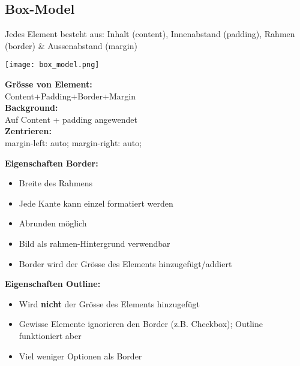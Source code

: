 \documentclass[7pt,landscape,a4paper]{scrartcl}
\begin{document}
\begin{multicols*}{4}
\subsection{Box-Model}
	Jedes Element besteht aus: \textcolor{b}{Inhalt} (content), \textcolor{b}{Innenabstand} (padding), \textcolor{b}{Rahmen} (border) \& \textcolor{b}{Aussenabstand} (margin)\\
	\begin{minipage}{0.4\linewidth}
		\texttt{[image: box\_model.png]}
	\end{minipage}
	\begin{minipage}{0.6\linewidth}
	\textbf{Grösse von Element:}\\
	Content+Padding+Border+Margin\\
	\textbf{Background:}\\
	Auf Content + padding angewendet\\
	\textbf{Zentrieren:}\\
	margin-left: auto; margin-right: auto;
\end{minipage}
	\textcolor{b}{\textbf{Eigenschaften Border:}}
	\begin{itemize}[topsep=0pt, leftmargin=3mm]
		\setlength\itemsep{-0.3em}
		\item Breite des Rahmens
		\item Jede Kante kann einzel formatiert werden
		\item Abrunden möglich
		\item Bild als rahmen-Hintergrund verwendbar
		\item Border wird der Grösse des Elements hinzugefügt/addiert
	\end{itemize}
	\textcolor{b}{\textbf{Eigenschaften Outline:}}
	\begin{itemize}[topsep=0pt, leftmargin=3mm]
		\setlength\itemsep{-0.3em}
		\item Wird \textbf{nicht} der Grösse des Elements hinzugefügt
		\item Gewisse Elemente ignorieren den Border (z.B. Checkbox); Outline funktioniert aber
		\item Viel weniger Optionen als Border
	\end{itemize}

\end{multicols*}
\end{document}
